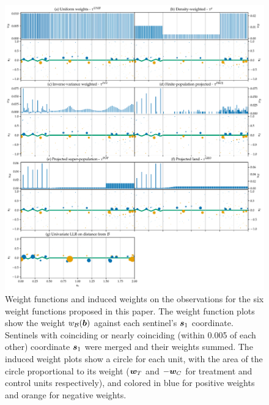 \begin{figure}[ptb]
\centering
\includegraphics[width=\textwidth]{figures/weight_functions.pdf}
\caption{
    \label{fig:weight_functions}
    Weight functions and induced weights on the observations for the six weight functions proposed in this paper. The weight function plots show the weight \(w_{\mathcal{B}}(\bm{b})\) against each sentinel's \(\bm{s}_1\) coordinate. Sentinels with coinciding or nearly coinciding (within 0.005 of each other) coordinate \(\bm{s}_1\) were merged and their weights summed. The induced weight plots show a circle for each unit, with the area of the circle proportional to its weight (\(\bm{w}_{T}\) and \(-\bm{w}_{C}\) for treatment and control units respectively), and colored in blue for positive weights and orange for negative weights.}
\end{figure}

